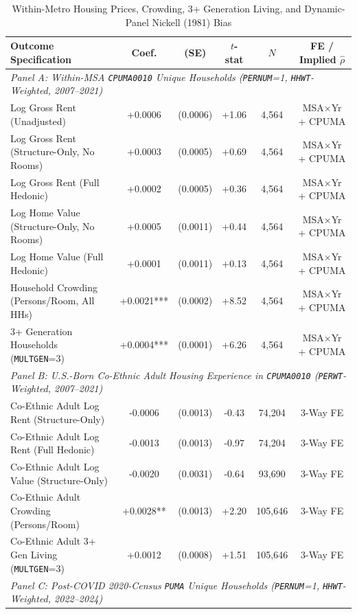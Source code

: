 \begin{table}[t!]
\centering
\caption{Within-Metro Housing Prices, Crowding, 3+ Generation Living, and Dynamic-Panel Nickell (1981) Bias}
\label{tab:cpuma_housing}
\scriptsize
\setlength{\tabcolsep}{4.0pt}
\renewcommand{\arraystretch}{1.04}
\begin{tabular}{lccccc}
\toprule
Outcome Specification & Coef. & (SE) & $t$-stat & $N$ & FE / Implied $\hat{\rho}$ \\
\midrule
\multicolumn{6}{l}{\textit{Panel A: Within-MSA \texttt{CPUMA0010} Unique Households (\texttt{PERNUM}=1, \texttt{HHWT}-Weighted, 2007--2021)}} \\
Log Gross Rent (Unadjusted) & +0.0006 & (0.0006) & +1.06 & 4,564 & MSA$\times$Yr + CPUMA \\
Log Gross Rent (Structure-Only, No Rooms) & +0.0003 & (0.0005) & +0.69 & 4,564 & MSA$\times$Yr + CPUMA \\
Log Gross Rent (Full Hedonic) & +0.0002 & (0.0005) & +0.36 & 4,564 & MSA$\times$Yr + CPUMA \\
Log Home Value (Structure-Only, No Rooms) & +0.0005 & (0.0011) & +0.44 & 4,564 & MSA$\times$Yr + CPUMA \\
Log Home Value (Full Hedonic) & +0.0001 & (0.0011) & +0.13 & 4,564 & MSA$\times$Yr + CPUMA \\
Household Crowding (Persons/Room, All HHs) & +0.0021*** & (0.0002) & +8.52 & 4,564 & MSA$\times$Yr + CPUMA \\
3+ Generation Households (\texttt{MULTGEN}=3) & +0.0004*** & (0.0001) & +6.26 & 4,564 & MSA$\times$Yr + CPUMA \\
\midrule
\multicolumn{6}{l}{\textit{Panel B: U.S.-Born Co-Ethnic Adult Housing Experience in \texttt{CPUMA0010} (\texttt{PERWT}-Weighted, 2007--2021)}} \\
Co-Ethnic Adult Log Rent (Structure-Only) & -0.0006 & (0.0013) & -0.43 & 74,204 & 3-Way FE \\
Co-Ethnic Adult Log Rent (Full Hedonic) & -0.0013 & (0.0013) & -0.97 & 74,204 & 3-Way FE \\
Co-Ethnic Adult Log Value (Structure-Only) & -0.0020 & (0.0031) & -0.64 & 93,690 & 3-Way FE \\
Co-Ethnic Adult Crowding (Persons/Room) & +0.0028** & (0.0013) & +2.20 & 105,646 & 3-Way FE \\
Co-Ethnic Adult 3+ Gen Living (\texttt{MULTGEN}=3) & +0.0012 & (0.0008) & +1.51 & 105,646 & 3-Way FE \\
\midrule
\multicolumn{6}{l}{\textit{Panel C: Post-COVID 2020-Census \texttt{PUMA} Unique Households (\texttt{PERNUM}=1, \texttt{HHWT}-Weighted, 2022--2024)}} \\

\end{tabular}
\end{table}
